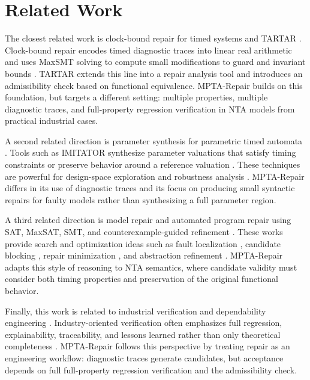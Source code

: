 ﻿\section{Related Work}
\label{sec:related-work}

The closest related work is clock-bound repair for timed systems and
TARTAR \cite{kolbl2019clock}. Clock-bound repair encodes timed diagnostic traces into
linear real arithmetic and uses MaxSMT solving to compute small
modifications to guard and invariant bounds \cite{kolbl2019clock}. TARTAR extends this
line into a repair analysis tool and introduces an admissibility check
based on functional equivalence. MPTA-Repair builds on this foundation,
but targets a different setting: multiple properties, multiple
diagnostic traces, and full-property regression verification in NTA
models from practical industrial cases.

A second related direction is parameter synthesis for parametric timed
automata \cite{alur1993parametric}. Tools such as IMITATOR synthesize parameter valuations
that satisfy timing constraints or preserve behavior around a reference
valuation \cite{andre2010imitator}. These techniques are powerful for design-space
exploration and robustness analysis \cite{bendik2021robustness}. MPTA-Repair differs in its
use of diagnostic traces and its focus on producing small syntactic
repairs for faulty models rather than synthesizing a full parameter
region.

A third related direction is model repair and automated program repair
using SAT, MaxSAT, SMT, and counterexample-guided refinement \cite{weimer2009automatically}.
These works provide search and optimization ideas such as fault
localization \cite{jose2011bugassist}, candidate blocking \cite{mechtaev2016angelix}, repair minimization
\cite{nguyen2013semfix}, and abstraction refinement \cite{clarke2000cegar}. MPTA-Repair adapts this
style of reasoning to NTA semantics, where candidate
validity must consider both timing properties and preservation of the
original functional behavior.

Finally, this work is related to industrial verification and
dependability engineering \cite{leveson2011safer}. Industry-oriented verification often
emphasizes full regression, explainability, traceability, and lessons
learned rather than only theoretical completeness \cite{clarke2018handbook}. MPTA-Repair
follows this perspective by treating repair as an engineering workflow:
diagnostic traces generate candidates, but acceptance depends on full
full-property regression verification and the admissibility check.
